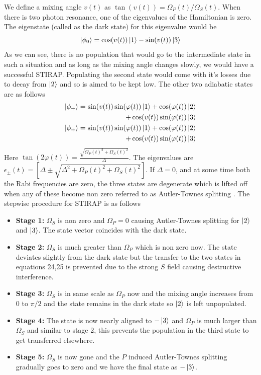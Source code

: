 \documentclass[%
 reprint,
 amsmath,amssymb,
 aps,
]{revtex4-2}
\begin{document}
We define a mixing angle $v(t)$ as $\tan(v(t)) = \Omega_P(t)/\Omega_S(t)$. When there is two photon resonance, one of the eigenvalues of the Hamiltonian is zero. The eigenstate (called as the dark state) for this eigenvalue would be
\begin{equation}
    \ket{\phi_0}
    = \cos(v(t))\ket{1} - \sin(v(t))\ket{3}
\end{equation}
As we can see, there is no population that would go to the intermediate state in such a situation and as long as the mixing angle changes slowly, we would have a successful STIRAP. Populating the second state would come with it's losses due to decay from $\ket{2}$ and so is aimed to be kept low. The other two adiabatic states are as follows \cite{doi:10.1063/1.458514}
\begin{eqnarray}
    \ket{\phi_+} = \sin(v(t))\sin(\varphi(t))\ket{1} + \cos(\varphi(t))\ket{2}\nonumber\\+\cos(v(t))\sin(\varphi(t))\ket{3}\\
    \ket{\phi_+} = \sin(v(t))\sin(\varphi(t))\ket{1} + \cos(\varphi(t))\ket{2}\nonumber\\+\cos(v(t))\sin(\varphi(t))\ket{3}
\end{eqnarray}
Here $\tan(2\varphi(t)) = \frac{\sqrt{\Omega_P(t)^2+\Omega_S(t)^2}}{\Delta}$. The eigenvalues are $\epsilon_\pm(t) = [\Delta\pm\sqrt{\Delta^2+\Omega_P(t)^2+\Omega_S(t)^2}]$. If $\Delta=0$, and at some time both the Rabi frequencies are zero, the three states are degenerate which is lifted off when any of these become non zero referred to as Autler-Townes splitting \cite{PhysRev.100.703}. The stepwise procedure for STIRAP is as follows \cite{73.043415}
\begin{itemize}
    \item \textbf{Stage 1:} $\Omega_S$ is non zero and $\Omega_P=0$ causing Autler-Townes splitting for $\ket{2}$ and $\ket{3}$. The state vector coincides with the dark state.
    \item \textbf{Stage 2:} $\Omega_S$ is much greater than $\Omega_P$ which is non zero now. The state deviates slightly from the dark state but the transfer to the two states in equations 24,25 is prevented due to the strong $S$ field causing destructive interference. 
    \item \textbf{Stage 3:} $\Omega_S$ is in same scale as $\Omega_P$ now and the mixing angle increases from 0 to $\pi/2$ and the state remains in the dark state so $\ket{2}$ is left unpopulated.
    \item \textbf{Stage 4:} The state is now nearly aligned to $-\ket{3}$ and $\Omega_P$ is much larger than $\Omega_S$ and similar to stage 2, this prevents the population in the third state to get transferred elsewhere.
    \item \textbf{Stage 5:} $\Omega_S$ is now gone and the $P$ induced Autler-Townes splitting gradually goes to zero and we have the final state as $-\ket{3}$.
\end{itemize}
\end{document}
